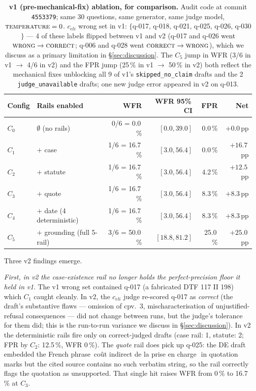 \documentclass[11pt,a4paper]{article}
\begin{document}
\begin{table}[h]
\centering
\caption{\textbf{v1 (pre-mechanical-fix) ablation, for
comparison.}  Audit code at commit \texttt{4553379}; same 30
questions, same generator, same judge model, $\textsc{temperature}=0$.
$c_{eli}$ wrong set in v1: $\{$q-017, q-018, q-021, q-025, q-026,
q-030$\}$ --- 4 of these labels flipped between v1 and v2 (q-017
and q-026 went $\textsc{wrong}\rightarrow \textsc{correct}$;
q-006 and q-028 went $\textsc{correct}\rightarrow \textsc{wrong}$),
which we discuss as a primary limitation in \S\ref{sec:discussion}.
The $C_5$ jump in WFR (3/6 in v1 $\rightarrow$ 4/6 in v2) and
the FPR jump (25\,\% in v1 $\rightarrow$ 50\,\% in v2) both
reflect the mechanical fixes unblocking all 9 of v1's
\texttt{skipped\_no\_claim} drafts and the 2
\texttt{judge\_unavailable} drafts; one new judge error
appeared in v2 on q-013.}
\label{tab:ablation_v1}
\begin{tabular}{llrrrr}
\toprule
\textbf{Config} & \textbf{Rails enabled} & \textbf{WFR} & \textbf{WFR 95\%\,CI} & \textbf{FPR} & \textbf{Net} \\
\midrule
$C_0$ & $\emptyset$ (no rails)        & 0/6 = 0.0\,\%  & $[0.0, 39.0]$  & 0.0\,\%   & $+0.0$\,pp \\
$C_1$ & $+$ case                      & 1/6 = 16.7\,\% & $[3.0, 56.4]$  & 0.0\,\%   & $+16.7$\,pp \\
$C_2$ & $+$ statute                   & 1/6 = 16.7\,\% & $[3.0, 56.4]$  & 4.2\,\%   & $+12.5$\,pp \\
$C_3$ & $+$ quote                     & 1/6 = 16.7\,\% & $[3.0, 56.4]$  & 8.3\,\%   & $+8.3$\,pp \\
$C_4$ & $+$ date  (4 deterministic)   & 1/6 = 16.7\,\% & $[3.0, 56.4]$  & 8.3\,\%   & $+8.3$\,pp \\
$C_5$ & $+$ grounding (full 5-rail)   & 3/6 = 50.0\,\% & $[18.8, 81.2]$ & 25.0\,\%  & $+25.0$\,pp \\
\bottomrule
\end{tabular}
\end{table}

Three v2 findings emerge.

\emph{First, in v2 the case-existence rail no longer holds
the perfect-precision floor it held in v1.}  The v1 wrong set
contained q-017 (a fabricated DTF 117 II 198) which $C_1$
caught cleanly.  In v2, the $c_{eli}$ judge re-scored q-017
as \emph{correct} (the draft's substantive flaws --- omission
of cpv.~3, mischaracterisation of unjustified-refusal
consequences --- did not change between runs, but the judge's
tolerance for them did; this is the run-to-run variance we
discuss in \S\ref{sec:discussion}).  In v2 the deterministic
rails fire only on correct-judged drafts (case rail: 1,
statute: 2; FPR by $C_2$: 12.5\,\%, WFR 0\,\%).  The
\emph{quote} rail does pick up q-025: the DE draft embedded
the French phrase \guillemotleft\,co\^ut indirect de la
prise en charge\,\guillemotright\ in quotation marks but
the cited source contains no such verbatim string, so the
rail correctly flags the quotation as unsupported.  That single
hit raises WFR from 0\,\% to 16.7\,\% at $C_3$.
\end{document}
